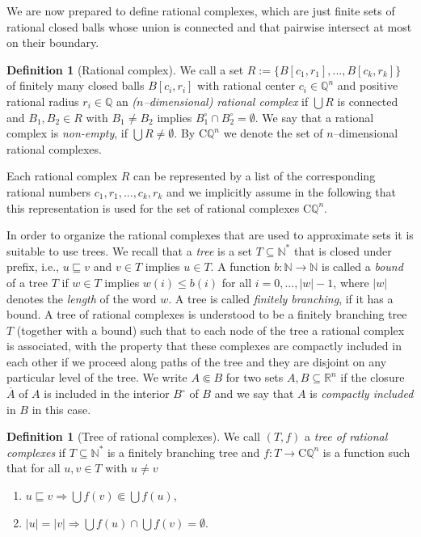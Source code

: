 \documentclass[a4paper]{amsart}
\def\IN{{\mathbb{N}}}
\def\IQ{{\mathbb{Q}}}
\def\IR{{\mathbb{R}}}
\def\TO{\Longrightarrow}
\def\In{\subseteq}
\def\prefix{\sqsubseteq}
\def\CQ{\mathrm C\IQ}
\theoremstyle{definition}
\newtheorem{definition}[theorem]{Definition}
\begin{document}
We are now prepared to define rational complexes, which are just finite sets of rational closed balls whose union is connected
and that pairwise intersect at most on their boundary. 

\begin{definition}[Rational complex]
We call a set $R:=\{B[c_1,r_1],...,B[c_k,r_k]\}$ of finitely many
closed balls $B[c_i,r_i]$ with rational center $c_i\in\IQ^n$ and 
positive rational radius $r_i\in\IQ$ an {\em ($n$--dimensional) rational complex}
if $\bigcup R$ is connected and $B_1,B_2\in R$ with $B_1\not=B_2$ 
implies $B_1^\circ\cap B_2^\circ=\emptyset$.
We say that a rational complex is {\em non-empty}, if $\bigcup R\not=\emptyset$.
By $\CQ^n$ we denote the set of $n$--dimensional rational complexes.
\end{definition}

Each rational complex $R$ can be represented by a list of the corresponding
rational numbers $c_1,r_1,...,c_k,r_k$ and we implicitly assume in the following
that this representation is used for the set of rational complexes $\CQ^n$.

In order to organize the rational complexes that are used to approximate sets
it is suitable to use trees.
We recall that a {\em tree} is a set $T\In\IN^*$ that is closed under prefix,
i.e., $u\prefix v$ and $v\in T$ implies $u\in T$.
A function $b:\IN\to\IN$ is called a {\em bound} of a tree $T$ if $w\in T$ implies $w(i)\leq b(i)$ for all $i=0,...,|w|-1$,
where $|w|$ denotes the {\em length} of the word $w$. A tree is called {\em finitely branching}, if it has a bound.
A tree of rational complexes is understood to be a finitely branching tree $T$ (together with a bound) such that to each node
of the tree a rational complex is associated, with the property that these complexes are compactly included in each
other if we proceed along paths of the tree and they are disjoint on any particular level of the tree.
We write $A\Subset B$ for two sets $A,B\In\IR^n$ if the closure $\overline{A}$ of $A$ is included in the interior $B^\circ$ of $B$
and we say that $A$ is {\em compactly included} in $B$ in this case.

\begin{definition}[Tree of rational complexes]
We call $(T,f)$ a {\em tree of rational complexes} if
$T\In\IN^*$ is a finitely branching tree and $f:T\to\CQ^n$ is
a function such that for all $u,v\in T$ with $u\not=v$
\begin{enumerate}
\item $u\prefix v\TO\bigcup f(v)\Subset\bigcup f(u)$,
\item $|u|=|v|\TO\bigcup f(u)\cap\bigcup f(v)=\emptyset$.
\end{enumerate}
\end{definition}
\end{document}
